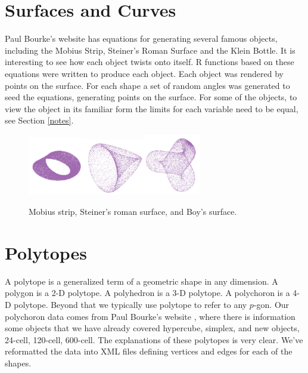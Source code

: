 \documentclass[a4paper]{report}
\begin{document}
\begin{article}
\section{Surfaces and Curves}

Paul Bourke's website \citep{PBCurves} has equations for generating
several famous objects, including the Mobius Strip, Steiner's Roman
Surface and the Klein Bottle. It is interesting to see how each object
twists onto itself.  R functions based on these equations were written
to produce each object.  Each object was rendered by points on the
surface. For each shape a set of random angles was generated to seed
the equations, generating points on the surface.  For some of the
objects, to view the object in its familiar form the limits for each
variable need to be equal, see Section \ref{notes}.

\begin{figure}[ht]
\centerline{
\includegraphics[width=1in]{mobius.pdf}\includegraphics[width=1in]{roman.pdf}\includegraphics[width=1in]{boy-surface.pdf}}
\caption{Mobius strip, Steiner's roman surface, and Boy's surface.}
\end{figure}

\section{Polytopes}

A polytope is a generalized term of a geometric shape in any
dimension. A polygon is a 2-D polytope. A polyhedron is a 3-D
polytope. A polychoron is a 4-D polytope. Beyond that we typically use
polytope to refer to any $p$-gon.  Our polychoron data comes from Paul
Bourke's website \citep{PBPlatonic}, where there is information some
objects that we have already covered hypercube, simplex, and new
objects, 24-cell, 120-cell, 600-cell.  The explanations of these
polytopes is very clear. We've reformatted the data into XML files
defining vertices and edges for each of the shapes.


\end{article}
\end{document}
